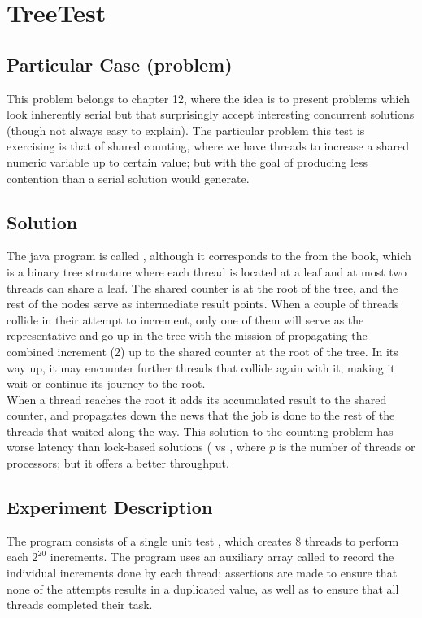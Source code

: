\section{\textbf{TreeTest}}

\subsection{Particular Case (problem)}
This problem belongs to chapter 12, where the idea is to present
problems which look inherently serial but that surprisingly accept
interesting concurrent solutions (though not always easy to
explain). The particular problem this test is exercising is that of
shared 
counting, where we have  threads to increase a shared numeric
variable up to certain value; but with the goal of producing less
contention than a serial solution would generate. 

\subsection{Solution}

The java program is called , although it corresponds to  
the  from the book, which is a binary tree structure
where each thread is located at a leaf and at most two threads can
share a leaf. The shared counter is at the root of the tree, and the
rest of the nodes serve as intermediate result points. When a couple
of threads collide in their attempt to increment, only one of them
will serve as the representative and go up in the tree with the mission
of propagating the combined increment (2) up to the shared counter at
the root of the tree. In its way up, it may encounter further threads
that collide again with it, making it wait or continue its journey to
the root. \\

When a thread reaches the root it adds its accumulated result to the
shared counter, and propagates down the news that the job is done to
the rest of the threads that waited along the way. This
solution to the counting problem has worse latency than lock-based
solutions ( vs , where $p$ is the number of
threads or processors; but it offers a better throughput. 

\subsection{Experiment Description}

The program consists of a single unit test ,
which creates 8 threads to perform each $2^20$ increments. The program
uses an auxiliary array called  to record the individual
increments done by each thread; assertions are made to ensure that
none of the attempts results in a duplicated value, as well as to
ensure that all threads completed their task.

